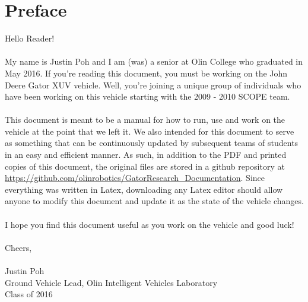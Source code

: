 \section{Preface}

Hello Reader! \\ \\
%
\noindent My name is Justin Poh and I am (was) a senior at Olin College who graduated in May 2016. If you're reading this document, you must be working on the John Deere Gator XUV vehicle. Well, you're joining a unique group of individuals who have been working on this vehicle starting with the 2009 - 2010 SCOPE team. \\ \\
%
This document is meant to be a manual for how to run, use and work on the vehicle at the point that we left it. We also intended for this document to serve as something that can be continuously updated by subsequent teams of students in an easy and efficient manner. As such, in addition to the PDF and printed copies of this document, the original files are stored in a github repository at \url{https://github.com/olinrobotics/GatorResearch_Documentation}. Since everything was written in Latex, downloading any Latex editor should allow anyone to modify this document and update it as the state of the vehicle changes.\\ \\
%
I hope you find this document useful as you work on the vehicle and good luck! \\ \\
%
Cheers,\\ \\
%
Justin Poh\\
Ground Vehicle Lead, Olin Intelligent Vehicles Laboratory\\
Class of 2016